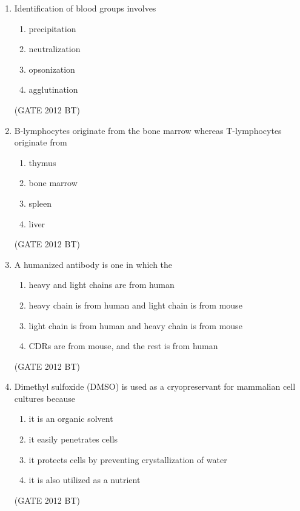 \documentclass[journal,12pt,onecolumn]{IEEEtran}
\theoremstyle{remark}
\begin{document}
\begin{enumerate}
\item 	Identification of blood groups involves
\begin{multicols}{4}
\begin{enumerate}
\item	precipitation	
\item  neutralization
\item opsonization
\item  agglutination
\end{enumerate}
\end{multicols} \hfill(GATE 2012 BT)

\item 	B-lymphocytes originate from the bone marrow whereas T-lymphocytes originate from
\begin{multicols}{4}
\begin{enumerate}
\item thymus	
\item  bone marrow	
\item  spleen	
\item  liver
\end{enumerate}
\end{multicols} \hfill(GATE 2012 BT)

\item 	A humanized antibody is one in which the
\begin{multicols}{2}
\begin{enumerate}
\item	heavy and light chains are from human
\item heavy chain is from human and light chain is from mouse
\item 	light chain is from human and heavy chain is from mouse
\item 	CDRs are from mouse, and the rest is from human
\end{enumerate}
\end{multicols} \hfill(GATE 2012 BT)

\item 	Dimethyl sulfoxide (DMSO) is used as a cryopreservant for mammalian cell cultures because
\begin{multicols}{2}
\begin{enumerate}
\item	it is an organic solvent
\item 	it easily penetrates cells
\item 	it protects cells by preventing crystallization of water
\item 	it is also utilized as a nutrient
\end{enumerate}
\end{multicols} \hfill(GATE 2012 BT)


\end{enumerate}
\end{document}
